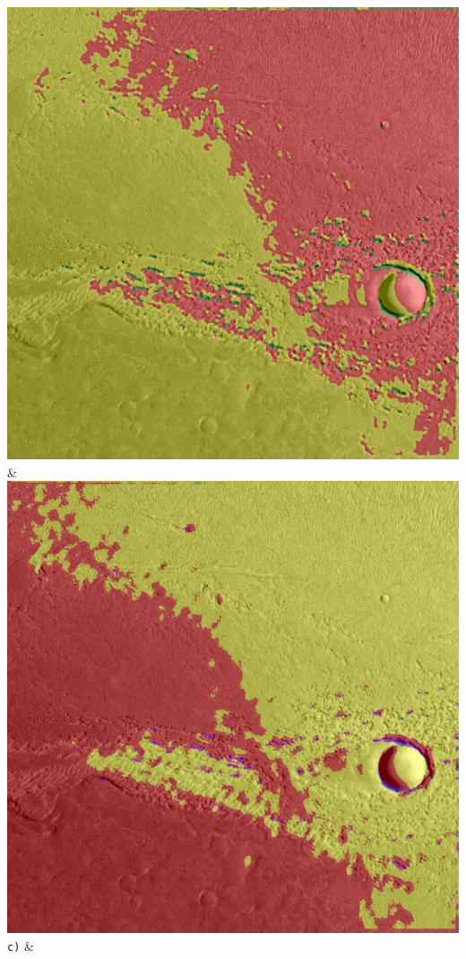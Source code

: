 \begin{table}[h!]
\begin{tabularx}{\textwidth}
		\includegraphics[width=0.9\linewidth]{images/gen/number_of_segments/p03_02.png_75.png} &
		\includegraphics[width=0.9\linewidth]{images/gen/number_of_segments/p03_02.png_100.png} \\
		\texttt{c)} &

\end{tabularx}
\end{table}

